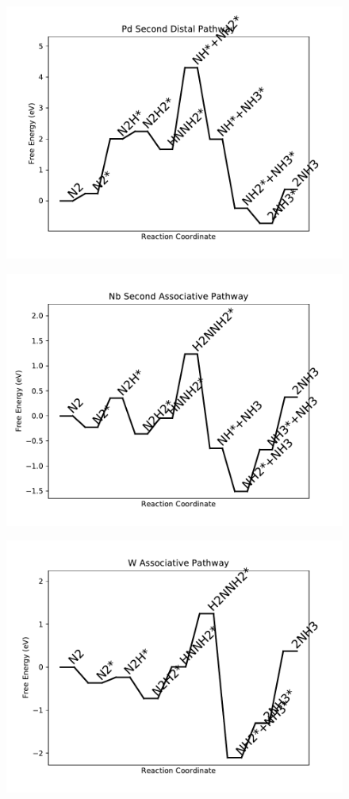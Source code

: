 \begin{figure}
\centering
\includegraphics[width=0.8\linewidth]{data/plots/Pd_distal_2.pdf}
\end{figure}

\begin{figure}
\centering
\includegraphics[width=0.8\linewidth]{data/plots/Nb_associative_2.pdf}
\end{figure}

\begin{figure}
\centering
\includegraphics[width=0.8\linewidth]{data/plots/W_associative.pdf}
\end{figure}

